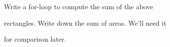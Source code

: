 Write a for-loop to compute the sum of the above

rectangles. Write down the sum of areas. We'll need it

for comparison later.

